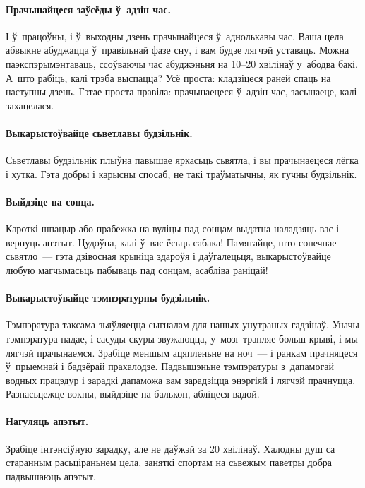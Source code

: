 \paragraph{Прачынайцеся заўсёды ў~адзін час.}
І ў~працоўны, і ў~выходны дзень прачынайцеся ў~аднолькавы час. Ваша цела абвыкне абуджацца ў~правільнай фазе сну, і вам будзе лягчэй уставаць. Можна паэкспэрымэнтаваць, ссоўваючы час абуджэньня на 10--20 хвілінаў у~абодва бакі. А~што рабіць, калі трэба выспацца? Усё проста: кладзіцеся раней спаць на наступны дзень. Гэтае проста правіла: прачынаецеся ў~адзін час, засынаеце, калі захацелася.

\paragraph{Выкарыстоўвайце сьветлавы будзільнік.}
Сьветлавы будзільнік плыўна павышае яркасьць сьвятла, і вы прачынаецеся лёгка і хутка. Гэта добры і карысны спосаб, не такі траўматычны, як гучны будзільнік.

\paragraph{Выйдзіце на сонца.}
Кароткі шпацыр або прабежка на вуліцы пад сонцам выдатна наладзяць вас і вернуць апэтыт. Цудоўна, калі ў~вас ёсьць сабака! Памятайце, што сонечнае сьвятло~--- гэта дзівосная крыніца здароўя і даўгалецьця, выкарыстоўвайце любую магчымасьць пабываць пад сонцам, асабліва раніцай!


\paragraph{Выкарыстоўвайце тэмпэратурны будзільнік.}
Тэмпэратура таксама зьяўляецца сыгналам для нашых унутраных гадзінаў. Уначы тэмпэратура падае, і сасуды скуры звужаюцца, у~мозг трапляе больш крыві, і мы лягчэй прачынаемся. Зрабіце меншым ацяпленьне на ноч~--- і ранкам прачняцеся ў~прыемнай і бадзёрай прахалодзе. Падвышэньне тэмпэратуры з~дапамогай водных працэдур і зарадкі дапаможа вам зарадзіцца энэргіяй і лягчэй прачнуцца. Разнасьцежце вокны, выйдзіце на балькон, абліцеся вадой.

\paragraph{Нагуляць апэтыт.}
Зрабіце інтэнсіўную зарадку, але не даўжэй за 20 хвілінаў. Халодны душ са старанным расьціраньнем цела, заняткі спортам на сьвежым паветры добра падвышаюць апэтыт.

